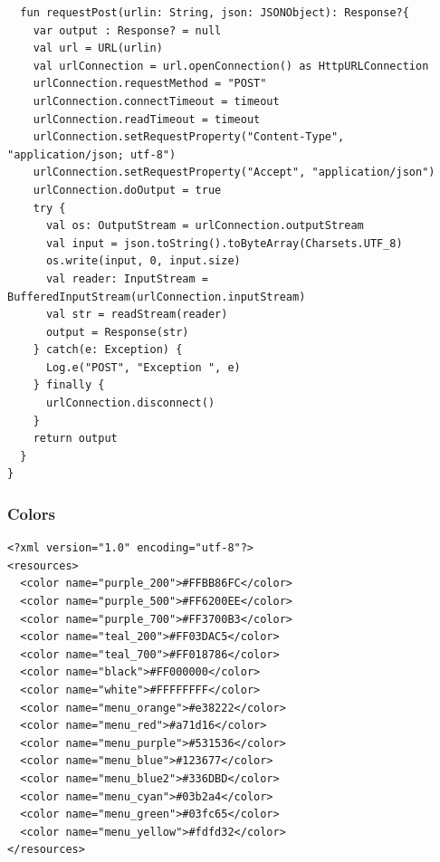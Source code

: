 \documentclass[11pt, a4paper]{article}
\begin{document}
\begin{appendices}
\begin{lstlisting}
  fun requestPost(urlin: String, json: JSONObject): Response?{
    var output : Response? = null
    val url = URL(urlin)
    val urlConnection = url.openConnection() as HttpURLConnection
    urlConnection.requestMethod = "POST"
    urlConnection.connectTimeout = timeout
    urlConnection.readTimeout = timeout
    urlConnection.setRequestProperty("Content-Type", "application/json; utf-8")
    urlConnection.setRequestProperty("Accept", "application/json")
    urlConnection.doOutput = true
    try {
      val os: OutputStream = urlConnection.outputStream
      val input = json.toString().toByteArray(Charsets.UTF_8)
      os.write(input, 0, input.size)
      val reader: InputStream = BufferedInputStream(urlConnection.inputStream)
      val str = readStream(reader)
      output = Response(str)
    } catch(e: Exception) {
      Log.e("POST", "Exception ", e)
    } finally {
      urlConnection.disconnect()
    }
    return output
  }
}
\end{lstlisting}
\subsubsection{Colors}
\begin{lstlisting}
<?xml version="1.0" encoding="utf-8"?>
<resources>
  <color name="purple_200">#FFBB86FC</color>
  <color name="purple_500">#FF6200EE</color>
  <color name="purple_700">#FF3700B3</color>
  <color name="teal_200">#FF03DAC5</color>
  <color name="teal_700">#FF018786</color>
  <color name="black">#FF000000</color>
  <color name="white">#FFFFFFFF</color>
  <color name="menu_orange">#e38222</color>
  <color name="menu_red">#a71d16</color>
  <color name="menu_purple">#531536</color>
  <color name="menu_blue">#123677</color>
  <color name="menu_blue2">#336DBD</color>
  <color name="menu_cyan">#03b2a4</color>
  <color name="menu_green">#03fc65</color>
  <color name="menu_yellow">#fdfd32</color>
</resources>
\end{lstlisting}

\end{appendices}
\end{document}
